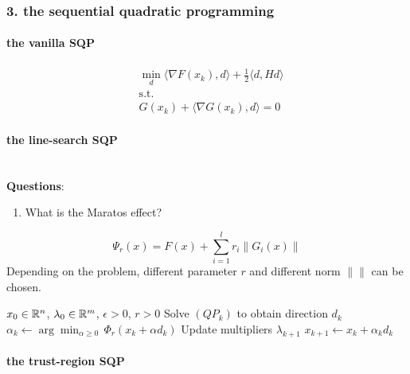 \subsubsection{3. the sequential quadratic programming}
\paragraph{the vanilla SQP}
\begin{equation*}
	\tag{$QP_k$}
	\begin{aligned}
		& \min_d \langle \nabla F(x_k), d \rangle + \frac{1}{2} \langle d, H d \rangle\\
		& \text{s.t.}\\
		& G(x_k) + \langle \nabla G(x_k), d \rangle = 0
	\end{aligned}
\end{equation*}


\paragraph{the line-search SQP} 
\quad\\
\textbf{Questions}:
\begin{enumerate}
	\item What is the Maratos effect?
\end{enumerate}

\begin{equation}
	\Psi_r(x) = F(x) + \sum_{i = 1}^l r_i \|G_i(x)\|
\end{equation}
Depending on the problem, different parameter $r$ and different norm $\| \|$ can be chosen. 

\begin{algorithm}
\caption{Sequential Quadratic Programming (SQP)}
\begin{algorithmic}[1]
\Require $x_0 \in \mathbb{R}^n$, $\lambda_0 \in \mathbb{R}^m$, $\epsilon > 0$, $r > 0$
  \State Solve $(QP_k)$ to obtain direction $d_k$
  \State $\alpha_k \gets \arg\min_{\alpha \ge 0}\, \Phi_r(x_k + \alpha d_k)$
  \State Update multipliers $\lambda_{k+1}$
  \State $x_{k+1} \gets x_k + \alpha_k d_k$
\EndFor
\end{algorithmic}
\end{algorithm}


\paragraph{the trust-region SQP}





